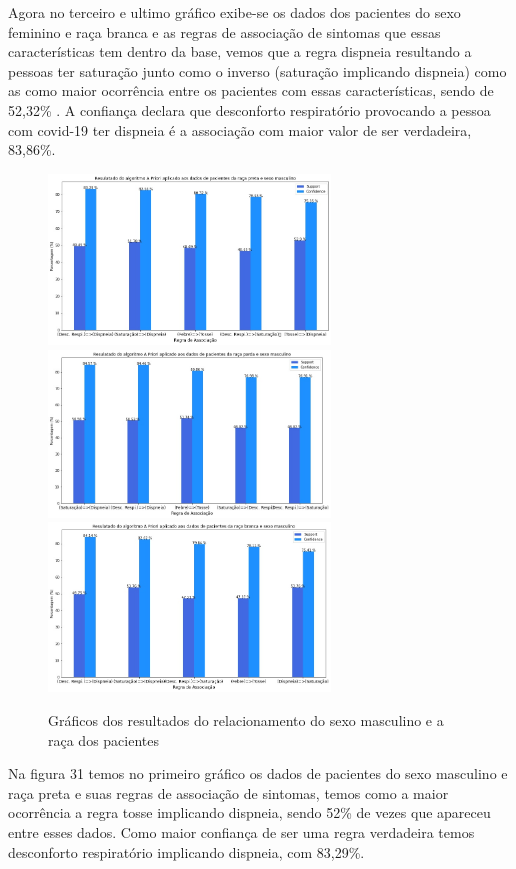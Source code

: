 \documentclass[tcc1]{uftex}
\begin{document}
     Agora no terceiro e ultimo gráfico exibe-se os dados dos pacientes do sexo feminino e raça branca e as regras de associação de sintomas que essas características tem dentro da base, vemos que a regra dispneia resultando a pessoas ter saturação junto como o inverso (saturação implicando dispneia) como as como maior ocorrência entre os pacientes com essas características, sendo de 52,32\% . A confiança declara que desconforto respiratório provocando a pessoa com covid-19 ter dispneia é a associação com maior valor de ser verdadeira, 83,86\%.
     
    
    \begin{figure}[!h]
    \centering
    \includegraphics[width=7.5cm]{1_Preta_masculino_apriori.jpg}
    \includegraphics[width=7.5cm]{1_Parda_masculino_apriori.jpg}
    \includegraphics[width=7.5cm]{1_Branca_masculino_apriori.jpg}
    \caption{Gráficos dos resultados do relacionamento do sexo masculino e a raça dos pacientes}
    \end{figure}
    
    Na figura 31 temos no primeiro gráfico os dados de pacientes do sexo masculino e raça preta e suas regras de associação de sintomas, temos como a maior ocorrência a regra tosse implicando dispneia, sendo 52\% de vezes que apareceu entre esses dados. Como maior confiança de ser uma regra verdadeira temos desconforto respiratório implicando dispneia, com 83,29\%.
    
\end{document}
